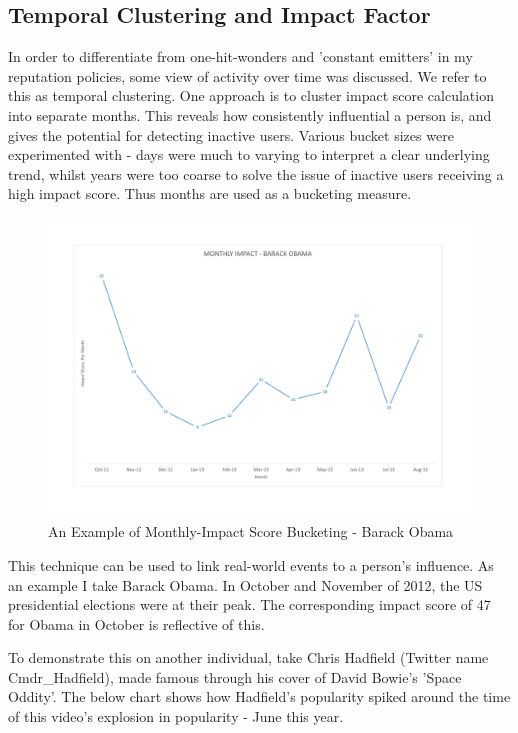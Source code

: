 \subsection{Temporal Clustering and Impact Factor}

In order to differentiate from one-hit-wonders and 'constant emitters' in my reputation policies, some view of activity over time was discussed. We refer to this as temporal clustering. One approach is to cluster impact score calculation into separate months. This reveals how consistently influential a person is, and gives the potential for detecting inactive users. Various bucket sizes were experimented with - days were much to varying to interpret a clear underlying trend, whilst years were too coarse to solve the issue of inactive users receiving a high impact score. Thus months are used as a bucketing measure.

\begin{figure}[h!]
\begin{center}
\centering
\includegraphics[width=500px]{Images/barack_obama_monthly_impact.pdf}
\caption{An Example of Monthly-Impact Score Bucketing - Barack Obama}
\end{center}
\end{figure}

This technique can be used to link real-world events to a person's influence. As an example I take Barack Obama. In October and November of 2012, the US presidential elections were at their peak. The corresponding impact score of 47 for Obama in October is reflective of this. 

To demonstrate this on another individual, take Chris Hadfield (Twitter name Cmdr\_Hadfield), made famous through his cover of David Bowie's 'Space Oddity'. The below chart shows how Hadfield's popularity spiked around the time of this video's explosion in popularity - June this year. 

